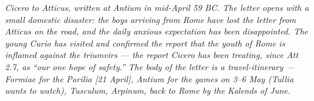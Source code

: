 
\textit{Cicero to Atticus, written at Antium in mid-April 59
BC. The letter opens with a small domestic disaster: the
boys arriving from Rome have lost the letter from Atticus
on the road, and the daily anxious expectation has been
disappointed. The young Curio has visited and confirmed the
report that the youth of Rome is inflamed against the
triumvirs --- the report Cicero has been treating, since
Att 2.7, as ``our one hope of safety.'' The body of the
letter is a travel-itinerary --- Formiae for the Parilia
[21 April], Antium for the games on 3--6 May (Tullia wants
to watch), Tusculum, Arpinum, back to Rome by the Kalends
of June.}
